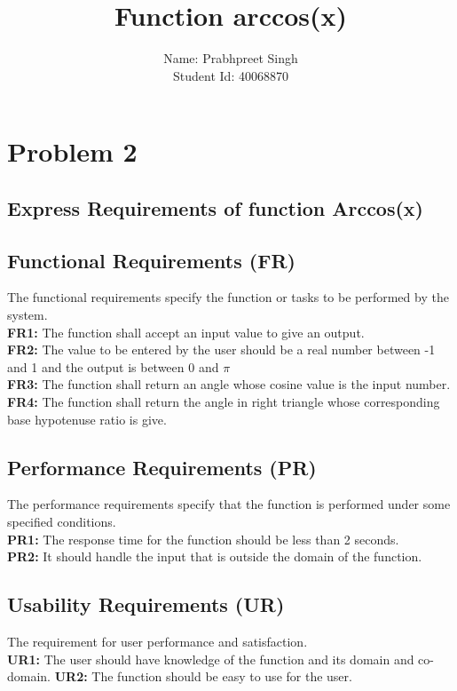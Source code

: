\documentclass[12pt]{report}
\begin{document}
\title{Function arccos(x)} %
\author{Name: Prabhpreet Singh \\Student Id: 40068870} %

\maketitle
\section*{Problem 2} %
\subsection*{Express Requirements of function Arccos(x)}
\subsection*{Functional Requirements (FR)}
The functional requirements specify the function or tasks to be performed by the system.\\ 
	\textbf{FR1: }The function shall accept an input value to give an output.\\
	\textbf{FR2: }The value to be entered by the user should be a real number between -1 and 1 and the output is between 0 and $\pi$\\
	\textbf{FR3: }The function shall return an angle whose cosine value is the input number.
	\textbf{FR4: }The function shall return the angle in right triangle whose corresponding base hypotenuse ratio is give.
	
\subsection*{Performance Requirements (PR)}The performance requirements specify that the function is performed under some specified conditions.\\
\textbf{PR1: }The response time for the function should be less than 2 seconds.\\
	\textbf{PR2: }It should handle the input that is outside the domain of the function.
\subsection*{Usability Requirements (UR)}The requirement for user performance and satisfaction.\\
	\textbf{UR1: }The user should have knowledge of the function and its domain and co-domain.
	\textbf{UR2: }The function should be easy to use for the user.
\end{document}
